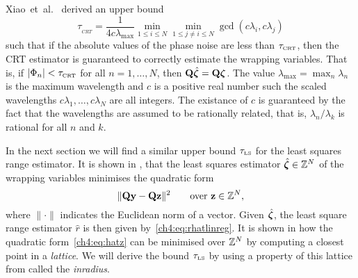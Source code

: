 Xiao~et~al.~\cite{Xiao_multistage_crt_2014} derived an upper bound 
\begin{equation}\label{eq:crt-upper-bound}
\tau_{_{CRT}} =  \frac{1}{4c \lambda_{\max}}\min_{1\leq i \leq N}  \min_{1\leq j \neq i \leq N} \gcd (c\lambda_i, c\lambda_j)
\end{equation} 
such that if the absolute values of the phase noise are less than $\tau_{\text{\tiny{CRT}}}$, then the CRT estimator is guaranteed to correctly estimate the wrapping variables.  That is, if  $\left\vert \Phi_n \right\vert < \tau_{\text{\tiny{CRT}}}$ for all $n = 1, \dots, N$, then $\mathbf{Q} \hat{\boldsymbol{\zeta}} = \mathbf{Q}\boldsymbol{\zeta}$.  The value $\lambda_{\text{max}} = \max_n \lambda_n$ is the maximum wavelength and $c$ is a positive real number such the scaled wavelengths $c \lambda_1, \dots, c \lambda_N$ are all integers.  The existance of $c$ is guaranteed by the fact that the wavelengths are assumed to be rationally related, that is, $\lambda_n/\lambda_k$ is rational for all $n$ and $k$.

In the next section we will find a similar upper bound $\tau_{\text{\tiny{LS}}}$ for the least squares range estimator.  It is shown in , that the least squares estimator $\hat{\boldsymbol{\zeta}} \in {\mathbb Z}^N$ of the wrapping variables minimises the quadratic form
\begin{equation}\label{ch4:eq:hatz}
\| \mathbf{Q}\mathbf{y} - \mathbf{Q}\mathbf{z} \|^2 \qquad \text{over $\mathbf{z} \in {\mathbb Z}^N$},
\end{equation}
where $\|\cdot\|$ indicates the Euclidean norm of a vector.  Given $\hat{\boldsymbol{\zeta}}$, the least square range estimator $\hat{r}$ is then given by~\ref{ch4:eq:rhatlinreg}.  It is shown in  how the quadratic form~\ref{ch4:eq:hatz} can be minimised over ${\mathbb Z}^N$ by computing a closest point in a \emph{lattice}.  We will derive the bound $\tau_{\text{\tiny{LS}}}$ by using a property of this lattice from  called the \emph{inradius}. 


